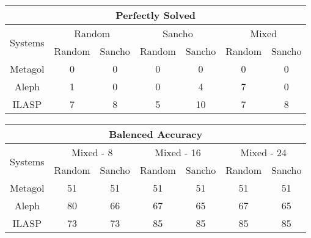 \begin{table}[]
	\begin{tabular}{|c|c|c|c|c|c|c|}
		\hline
		\multicolumn{7}{|c|}{Perfectly Solved}                                                                            \\ \hline
		\multirow{2}{*}{Systems} & \multicolumn{2}{c|}{Random} & \multicolumn{2}{c|}{Sancho} & \multicolumn{2}{c|}{Mixed} \\ \cline{2-7} 
		& Random       & Sancho       & Random       & Sancho       & Random       & Sancho      \\ \hline
		Metagol                  & 0            & 0            & 0            & 0            & 0            & 0           \\ \hline
		Aleph                    & 1            & 0            & 0            & 4            & 7            & 0           \\ \hline
		ILASP                    & 7            & 8            & 5            & 10           & 7            & 8           \\ \hline
	\end{tabular}
\end{table}

\begin{table}[]
	\begin{tabular}{|c|c|c|c|c|c|c|}
		\hline
		\multicolumn{7}{|c|}{Balenced Accuracy}                                                                                       \\ \hline
		\multirow{2}{*}{Systems} & \multicolumn{2}{c|}{Mixed - 8} & \multicolumn{2}{c|}{Mixed - 16} & \multicolumn{2}{c|}{Mixed - 24} \\ \cline{2-7} 
		& Random         & Sancho        & Random         & Sancho         & Random         & Sancho         \\ \hline
		Metagol                  & 51             & 51            & 51             & 51             & 51             & 51             \\ \hline
		Aleph                    & 80             & 66            & 67             & 65             & 67             & 65             \\ \hline
		ILASP                    & 73             & 73            & 85             & 85             & 85             & 85             \\ \hline
	\end{tabular}
\end{table}

